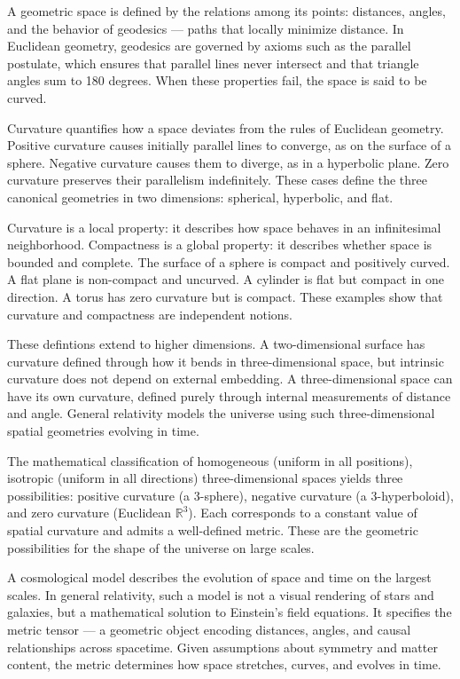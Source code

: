 A geometric space is defined by the relations among its points: distances, angles, and the behavior of geodesics — paths that locally minimize distance. In Euclidean geometry, geodesics are governed by axioms such as the parallel postulate, which ensures that parallel lines never intersect and that triangle angles sum to 180 degrees. When these properties fail, the space is said to be curved.

Curvature quantifies how a space deviates from the rules of Euclidean geometry. Positive curvature causes initially parallel lines to converge, as on the surface of a sphere. Negative curvature causes them to diverge, as in a hyperbolic plane. Zero curvature preserves their parallelism indefinitely. These cases define the three canonical geometries in two dimensions: spherical, hyperbolic, and flat.

Curvature is a local property: it describes how space behaves in an infinitesimal neighborhood. Compactness is a global property: it describes whether space is bounded and complete. The surface of a sphere is compact and positively curved. A flat plane is non-compact and uncurved. A cylinder is flat but compact in one direction. A torus has zero curvature but is compact. These examples show that curvature and compactness are independent notions.

These defintions extend to higher dimensions. A two-dimensional surface has curvature defined through how it bends in three-dimensional space, but intrinsic curvature does not depend on external embedding. A three-dimensional space can have its own curvature, defined purely through internal measurements of distance and angle. General relativity models the universe using such three-dimensional spatial geometries evolving in time.

The mathematical classification of homogeneous (uniform in all positions), isotropic (uniform in all directions) three-dimensional spaces yields three possibilities: positive curvature (a 3-sphere), negative curvature (a 3-hyperboloid), and zero curvature (Euclidean $\mathbb{R}^3$). Each corresponds to a constant value of spatial curvature and admits a well-defined metric. These are the geometric possibilities for the shape of the universe on large scales.

A cosmological model describes the evolution of space and time on the largest scales. In general relativity, such a model is not a visual rendering of stars and galaxies, but a mathematical solution to Einstein’s field equations. It specifies the metric tensor — a geometric object encoding distances, angles, and causal relationships across spacetime. Given assumptions about symmetry and matter content, the metric determines how space stretches, curves, and evolves in time.

